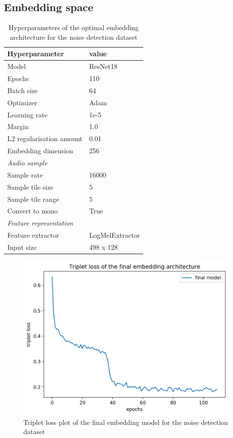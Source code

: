 \subsection{Embedding space}
\label{sub:Eval-Embedding-Space-DCASE}
\begin{table}[ht]
    \centering
    \caption{Hyperparameters of the optimal embedding architecture for the noise detection dataset}
	\label{tab:Hyperparameters-DCASE}
    \begin{tabular}{l|l}
        \toprule
        \textbf{Hyperparameter} & \textbf{value} \\ 
        \midrule[1pt]
        Model & ResNet18 \\ 
        \hline
        Epochs & 110 \\ 
        \hline
        Batch size & 64 \\ 
        \hline
        Optimizer & Adam \\ 
        \hline
        Learning rate & 1e-5 \\
        \hline
        Margin & 1.0 \\
        \hline
        L2 regularisation amount & 0.01 \\
        \hline
        Embedding dimension & 256 \\
        \midrule[1pt]
        \multicolumn{2}{l}{\textit{Audio sample}} \\
        \midrule[1pt]
        Sample rate & 16000 \\ 
        \hline
        Sample tile size & 5 \\
        \hline
        Sample tile range & 5 \\
        \hline
        Convert to mono & True \\
        \midrule[1pt]
        \multicolumn{2}{l}{\textit{Feature representation}} \\
        \midrule[1pt]
        Feature extractor & LogMelExtractor \\ 
        \hline
        Input size & 498 x 128 \\
        \bottomrule
    \end{tabular}
\end{table}
\begin{figure}[ht]
\centering
    \includegraphics[width=0.6\linewidth]{img/Triplet_loss_DCASE_final.png}
    \caption{Triplet loss plot of the final embedding model for the noise detection dataset}
    \label{fig:Triplet-Loss-DCASE}
\end{figure}
